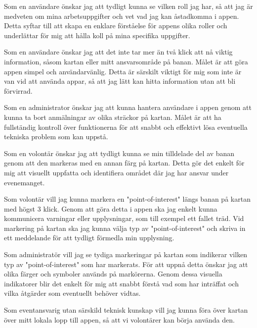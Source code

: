 Som en användare önskar jag att tydligt kunna se vilken roll jag har, så att jag är medveten om mina arbetsuppgifter och vet vad jag kan åstadkomma i appen. Detta syftar till att skapa en enklare förståelse för appens olika roller och underlättar för mig att hålla koll på mina specifika uppgifter.

\vspace{1em}
Som en användare önskar jag att det inte tar mer än två klick att nå viktig information, såsom kartan eller mitt ansvarsområde på banan. Målet är att göra appen simpel och användarvänlig. Detta är särskilt viktigt för mig som inte är van vid att använda appar, så att jag lätt kan hitta information utan att bli förvirrad.

\vspace{1em}
Som en administrator önskar jag att kunna hantera användare i appen genom att kunna ta bort anmälningar av olika sträckor på kartan. Målet är att ha fullständig kontroll över funktionerna för att snabbt och effektivt lösa eventuella tekniska problem som kan uppstå.

\vspace{1em}
Som en volontär önskar jag att tydligt kunna se min tilldelade del av banan genom att den markeras med en annan färg på kartan. Detta gör det enkelt för mig att visuellt uppfatta och identifiera området där jag har ansvar under evenemanget.

\vspace{1em}

Som volontär vill jag kunna markera en "point-of-interest" längs banan på kartan med högst 3 klick. Genom att göra detta i appen ska jag enkelt kunna kommunicera varningar eller upplysningar, som till exempel ett fallet träd. Vid markering på kartan ska jag kunna välja typ av "point-of-interest" och skriva in ett meddelande för att tydligt förmedla min upplysning.
\vspace{1em}

Som administratör vill jag se tydiga markeringar på kartan som indikerar vilken typ av "point-of-interest" som har markerats. För att uppnå detta önskar jag att olika färger och symboler används på markörerna. Genom dessa visuella indikatorer blir det enkelt för mig att snabbt förstå vad som har inträffat och vilka åtgärder som eventuellt behöver vidtas.

\vspace{1em}
Som eventansvarig utan särskild teknisk kunskap vill jag kunna föra över kartan över mitt lokala lopp till appen, så att vi volontärer kan börja använda den. 



